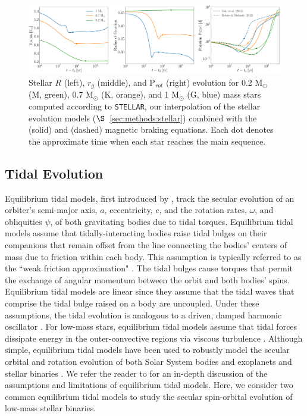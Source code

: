 \documentclass[twocolumn]{aastex61}
\newcommand{\stellar}[0]{\texttt{STELLAR}\xspace}
\begin{document}
\begin{figure}[ht]
	\includegraphics[width=\textwidth]{../Plots/stellarExample.pdf}
   \caption{Stellar $R$ (left), $r_g$ (middle), and P$_{rot}$ (right) evolution for 0.2 M$_{\odot}$ (M, green), 0.7 M$_{\odot}$ (K, orange), and 1 M$_{\odot}$ (G, blue) mass stars computed according to \stellar, our interpolation of the \citet{Baraffe2015} stellar evolution models ($\S$~\ref{sec:methods:stellar}) combined with the \citet{Matt2015} (solid) and \citet{Reiners2012} (dashed) magnetic braking equations. Each dot denotes the approximate time when each star reaches the main sequence.}%
    \label{fig:stellarExample}%
\end{figure}

\subsection{Tidal Evolution} \label{sec:methods:eqtide}

 Equilibrium tidal models, first introduced by \citep{Darwin1880}, track the secular evolution of an orbiter's semi-major axis, $a$, eccentricity, $e$, and the rotation rates, $\omega$, and obliquities $\psi$, of both gravitating bodies due to tidal torques. Equilibrium tidal models assume that tidally-interacting bodies raise tidal bulges on their companions that remain offset from the line connecting the bodies' centers of mass due to friction within each body. This assumption is typically referred to as the ``weak friction approximation" \citep{Zahn2008}.  The tidal bulges cause torques that permit the exchange of angular momentum between the orbit and both bodies' spins. Equilibrium tidal models are linear since they assume that the tidal waves that comprise the tidal bulge raised on a body are uncoupled. Under these assumptions, the tidal evolution is analogous to a driven, damped harmonic oscillator \citep{Greenberg2009}. For low-mass stars, equilibrium tidal models assume that tidal forces dissipate energy in the outer-convective regions via viscous turbulence \citep[see][]{Zahn2008}. Although simple, equilibrium tidal models have been used to robustly model the secular orbital and rotation evolution of both Solar System bodies and exoplanets \citep[e.g.][]{Goldreich1966,Jackson2009,Leconte2010,Heller2011,Barnes2013,Barnes2017} and stellar binaries \citep[e.g.][]{Zahn1989,Zahn2008,Khaliullin2011,Repetto2014,Fleming2018}. We refer the reader to \citet{Barnes2017} for an in-depth discussion of the assumptions and limitations of equilibrium tidal models. Here, we consider two common equilibrium tidal models to study the secular spin-orbital evolution of low-mass stellar binaries.  
\end{document}
